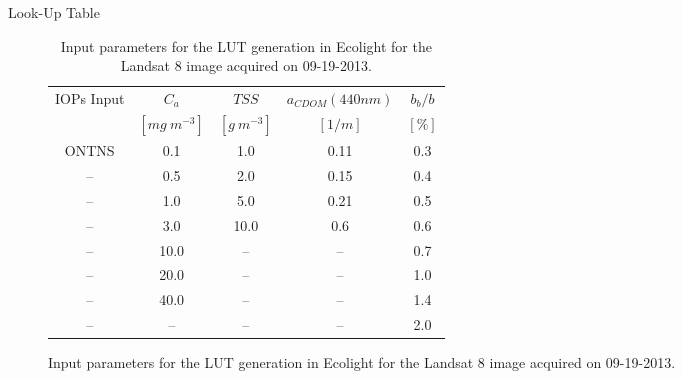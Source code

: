 \documentclass[mathserif]{beamer}
\begin{document}
\begin{frame}{}
\begin{columns}[t]
\begin{column}{.3\linewidth}
\end{column}
 \begin{column}{.3\linewidth}
\begin{block}{Look-Up Table}

\begin{figure}[htb]
  \begin{minipage}[c]{0.44\linewidth}
\begin{table}[htb]
\caption{Input parameters for the LUT generation in Ecolight for the Landsat 8 image acquired on 09-19-2013. \label{tab:LUTconc2}} 
\scriptsize
\centering
    \begin{tabular}{c|c|c|c|c}
    \hline \hline
            IOPs Input & \bfseries{$C_a$} & \bfseries{$TSS$} & \bfseries{$a_{CDOM}(440nm)$} & \bfseries{$b_b/b$}    \\
                   & $[mg~m^{-3}]$        & $[g~m^{-3}]$       &  $[1/m]$           & $[\%]$            \\ \hline \hline
ONTNS   &  0.1    & 1.0     &  0.11   &  0.3  \\
--    &  0.5    & 2.0     &  0.15   &  0.4  \\
--      &  1.0    & 5.0     &  0.21   &  0.5  \\
--      &  3.0    & 10.0    &  0.6    &  0.6  \\ 
--    &  10.0     & --    &  --   &  0.7  \\  
--      &  20.0     & --    &  --   &  1.0  \\  
--      &  40.0     & --    &  --   &  1.4  \\
--      &  --       & --    &  --   &  2.0  \\ \hline


\end{tabular}
\end{table}
\end{minipage}
\end{figure}
\end{block}
\end{column}
\end{columns}
\end{frame}
\end{document}
